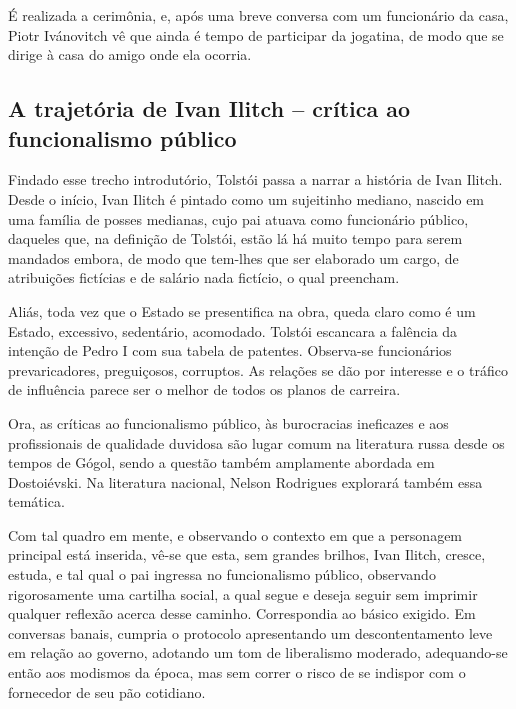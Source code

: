 \documentclass[12pt]{extarticle}
\begin{document}
É realizada a cerimônia, e, após uma breve conversa com um funcionário
da casa, Piotr Ivánovitch vê que ainda é tempo de participar da
jogatina, de modo que se dirige à casa do amigo onde ela ocorria.

\subsection{A trajetória de Ivan Ilitch -- crítica ao funcionalismo público}

Findado esse trecho introdutório, Tolstói passa a narrar a história de
Ivan Ilitch. Desde o início, Ivan Ilitch é pintado como um sujeitinho
mediano, nascido em uma família de posses medianas, cujo pai atuava como
funcionário público, daqueles que, na definição de Tolstói, estão lá há
muito tempo para serem mandados embora, de modo que tem-lhes que ser
elaborado um cargo, de atribuições fictícias e de salário nada fictício,
o qual preencham.

Aliás, toda vez que o Estado se presentifica na obra, queda claro como é
um Estado, excessivo, sedentário, acomodado. Tolstói escancara a
falência da intenção de Pedro I com sua tabela de patentes. Observa-se
funcionários prevaricadores, preguiçosos, corruptos. As relações se dão
por interesse e o tráfico de influência parece ser o melhor de todos os
planos de carreira.






Ora, as críticas ao funcionalismo público, às burocracias ineficazes e
aos profissionais de qualidade duvidosa são lugar comum na literatura
russa desde os tempos de Gógol, sendo a questão também amplamente
abordada em Dostoiévski. Na literatura nacional, Nelson Rodrigues
explorará também essa temática.

Com tal quadro em mente, e observando o contexto em que a personagem
principal está inserida, vê-se que esta, sem grandes brilhos, Ivan
Ilitch, cresce, estuda, e tal qual o pai ingressa no funcionalismo
público, observando rigorosamente uma cartilha social, a qual segue e
deseja seguir sem imprimir qualquer reflexão acerca desse caminho.
Correspondia ao básico exigido. Em conversas banais, cumpria o protocolo
apresentando um descontentamento leve em relação ao governo, adotando um
tom de liberalismo moderado, adequando-se então aos modismos da época,
mas sem correr o risco de se indispor com o fornecedor de seu pão
cotidiano.
\end{document}
